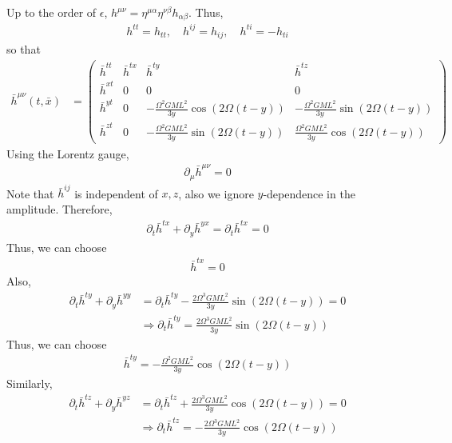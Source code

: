 \documentclass[12pt]{article}
\begin{document}
Up to the order of $\epsilon$, $h^{\mu \nu} = \eta^{\mu \alpha} \eta^{\nu \beta} h_{\alpha \beta}$. Thus,
\begin{align}
h^{tt} = h_{tt}, \quad h^{ij} = h_{ij}, \quad h^{ti} = - h_{ti}
\end{align}
so that
\begin{align}
\bar{h}^{\mu \nu}(t, \bar{x}) &=
\begin{pmatrix}
\bar{h}^{tt} & \bar{h}^{tx} & \bar{h}^{ty} & \bar{h}^{tz}\\
\bar{h}^{xt} & 0 & 0 & 0\\
\bar{h}^{yt} & 0 & - \frac{\Omega^2 G M L^2}{3 y} \cos\left(2 \Omega (t-y)\right) & - \frac{\Omega^2 G M L^2}{3 y} \sin\left(2 \Omega (t-y)\right)\\
\bar{h}^{zt} & 0 & - \frac{\Omega^2 G M L^2}{3 y} \sin\left(2 \Omega (t-y)\right) &  \frac{\Omega^2 G M L^2}{3 y} \cos\left(2 \Omega (t-y)\right)
\end{pmatrix}
\end{align}
Using the Lorentz gauge,
\begin{align}
\partial_{\mu} \bar{h}^{\mu \nu} = 0
\end{align}
Note that $\bar{h}^{i j}$ is independent of $x, z$, also we ignore $y$-dependence in the amplitude. Therefore,
\begin{align}
\partial_{t} \bar{h}^{tx} + \partial_{y} \bar{h}^{yx} = \partial_{t} \bar{h}^{tx} = 0
\end{align}
Thus, we can choose
\begin{align}
\bar{h}^{tx} = 0
\end{align}
Also,
\begin{align}
\partial_{t} \bar{h}^{ty} + \partial_{y} \bar{h}^{yy} &= \partial_{t} \bar{h}^{ty} - \frac{2 \Omega^3 G M L^2}{3 y} \sin\left(2 \Omega (t-y)\right) = 0\\
& \Rightarrow \partial_{t} \bar{h}^{ty} = \frac{2 \Omega^3 G M L^2}{3 y} \sin\left(2 \Omega (t-y)\right)
\end{align}
Thus, we can choose
\begin{align}
\bar{h}^{ty} = - \frac{\Omega^2 G M L^2}{3 y} \cos\left(2 \Omega (t-y)\right)
\end{align}
Similarly,
\begin{align}
\partial_{t} \bar{h}^{tz} + \partial_{y} \bar{h}^{yz} &= \partial_{t} \bar{h}^{tz} + \frac{2 \Omega^3 G M L^2}{3 y} \cos\left(2 \Omega (t-y)\right) = 0\\
& \Rightarrow \partial_{t} \bar{h}^{tz} = - \frac{2 \Omega^3 G M L^2}{3 y} \cos\left(2 \Omega (t-y)\right)
\end{align}
\end{document}
